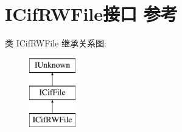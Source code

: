 \hypertarget{interface_i_cif_r_w_file}{}\section{I\+Cif\+R\+W\+File接口 参考}
\label{interface_i_cif_r_w_file}
类 I\+Cif\+R\+W\+File 继承关系图\+:\begin{figure}[H]
\begin{center}
\leavevmode
\includegraphics[height=3.000000cm]{interface_i_cif_r_w_file}
\end{center}
\end{figure}
